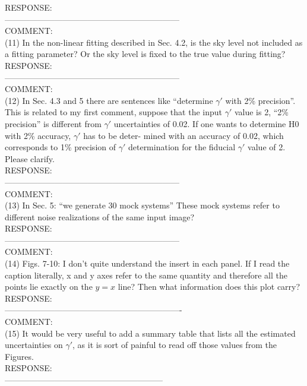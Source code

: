 \documentclass[a4paper,11pt]{article}
\begin{document}
RESPONSE:
\\

---------------------------------------------------------------
\\
COMMENT:
\\
(11) In the non-linear fitting described in Sec. 4.2, is the sky level not included as a fitting parameter? Or the sky level is fixed to the true value during fitting?
\\

RESPONSE:
\\

---------------------------------------------------------------
\\
COMMENT:
\\
(12) In Sec. 4.3 and 5 there are sentences like “determine $\gamma'$ with 2\% precision”. This is related to my first comment, suppose that the input $\gamma'$ value is 2, “2\% precision” is different from $\gamma'$ uncertainties of 0.02. If one wants to determine H0 with 2\% accuracy, $\gamma'$ has to be deter- mined with an accuracy of 0.02, which corresponds to 1\% precision of $\gamma'$ determination for the fiducial $\gamma'$ value of 2. Please clarify.
\\

RESPONSE:
\\

---------------------------------------------------------------
\\
COMMENT:
\\
(13) In Sec. 5: “we generate 30 mock systems” These mock systems refer to different noise realizations of the same input image?
\\

RESPONSE:
\\

---------------------------------------------------------------
\\
COMMENT:
\\
(14) Figs. 7-10: I don’t quite understand the insert in each panel. If I read the caption literally, x and y axes refer to the same quantity and therefore all the points lie exactly on the $y = x$ line? Then what information does this plot carry?
\\

RESPONSE:
\\

----------------------------------------------------------------
\\
COMMENT:
\\
(15) It would be very useful to add a summary table that lists all the estimated uncertainties on $\gamma'$, as it is sort of painful to read off those values from the Figures.
\\

RESPONSE:
\\

---------------------------------------------------------
\end{document}
